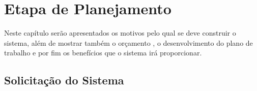 

\chapter{Etapa de Planejamento}


Neste capítulo serão  apresentados os motivos pelo qual se deve construir o sistema, além de mostrar também o orçamento , o desenvolvimento do plano de trabalho e por fim os benefícios que o sistema irá proporcionar.


\section{Solicita\c{c}\~{a}o do Sistema}
